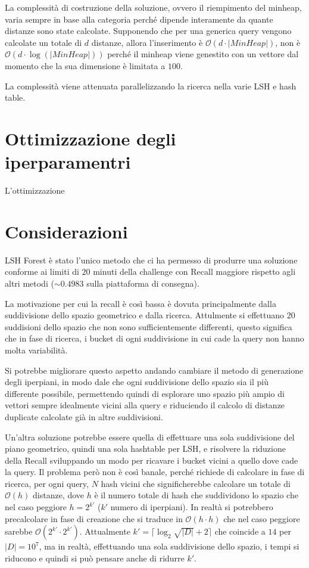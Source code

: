 La complessità di costruzione della soluzione, ovvero il riempimento del minheap,
varia sempre in base alla categoria perché dipende interamente da quante distanze 
sono state calcolate. Supponendo che per una generica query vengono calcolate un 
totale di $d$ distanze, allora l'inserimento è $\mathcal{O}(d\cdot |MinHeap|)$, non è 
$\mathcal{O}(d\cdot \log(|MinHeap|))$ perché il minheap viene genestito con un vettore dal 
momento che la sua dimensione è limitata a $100$.

La complessità viene attenuata parallelizzando la ricerca nella varie LSH e hash table.

\section{Ottimizzazione degli iperparamentri}
L'ottimizzazione

\section{Considerazioni}
LSH Forest è stato l'unico metodo che ci ha permesso di produrre una soluzione 
conforme ai limiti di $20$ minuti della challenge con Recall maggiore rispetto
agli altri metodi ($\sim 0.4983$ sulla piattaforma di consegna). 

La motivazione per cui la recall è così bassa è dovuta principalmente dalla suddivisione 
dello spazio geometrico e dalla ricerca. Attulmente si effettuano $20$ suddisioni
dello spazio che non sono sufficientemente differenti, questo significa che in 
fase di ricerca, i bucket di ogni suddivisione in cui cade la query non hanno molta 
variabilità.

Si potrebbe migliorare questo aspetto andando cambiare il metodo di generazione 
degli iperpiani, in modo dale che ogni suddivisione dello spazio sia il più differente 
possibile, permettendo quindi di esplorare uno spazio più ampio di vettori 
sempre idealmente vicini alla query e riduciendo il calcolo di distanze duplicate 
calcolate già in altre suddivisioni. 

Un'altra soluzione potrebbe essere quella di effettuare una sola suddivisione del
piano geometrico, quindi una sola hashtable per LSH, e risolvere la riduzione della 
Recall sviluppando un modo per ricavare i bucket vicini a quello dove cade la query.
Il problema però non è così banale, perché richiede di calcolare in fase di ricerca, per ogni query,
$N$ hash vicini che significherebbe calcolare un totale di $\mathcal{O}(h)$ 
distanze, dove $h$ è il numero totale di hash che suddividono lo spazio che nel 
caso peggiore $h= 2^{k'}$ ($k'$ numero di iperpiani). In realtà 
si potrebbero precalcolare in fase di creazione che si traduce in $\mathcal{O}(h\cdot h)$
che nel caso peggiore sarebbe $ \mathcal{O}(2^{k'}\cdot 2^{k'})$. Attualmente 
$k'=\lceil \log_2\sqrt{|D|}+2\rceil$ che coincide a $14$ per $|D|= 10^7$, ma in realtà,
effettuando una sola suddivisione dello spazio, i tempi si riducono e quindi 
si può pensare anche di ridurre $k'$.